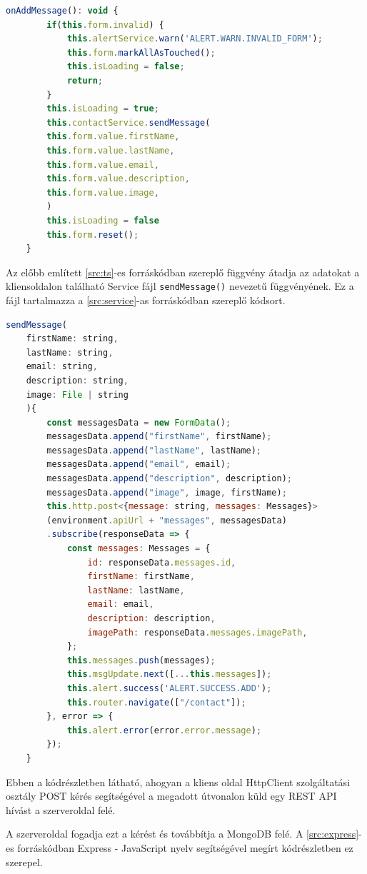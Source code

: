\begin{lstlisting}[language=JavaScript]
	onAddMessage(): void {
		if(this.form.invalid) {
			this.alertService.warn('ALERT.WARN.INVALID_FORM');
			this.form.markAllAsTouched();
			this.isLoading = false;
			return;
		}
		this.isLoading = true;
		this.contactService.sendMessage(
		this.form.value.firstName,
		this.form.value.lastName,
		this.form.value.email,
		this.form.value.description,
		this.form.value.image,
		)
		this.isLoading = false
		this.form.reset();
	}
\end{lstlisting}

Az előbb említett \ref{src:ts}-es forráskódban szereplő függvény átadja az adatokat a kliensoldalon található Service fájl \verb|sendMessage()| nevezetű függvényének. Ez a fájl tartalmazza a \ref{src:service}-as forráskódban szereplő kódsort.

\begin{lstlisting}[language=JavaScript]
	sendMessage(
	firstName: string, 
	lastName: string, 
	email: string, 
	description: string, 
	image: File | string
	){
		const messagesData = new FormData();
		messagesData.append("firstName", firstName);
		messagesData.append("lastName", lastName);
		messagesData.append("email", email);
		messagesData.append("description", description);
		messagesData.append("image", image, firstName);
		this.http.post<{message: string, messages: Messages}>
		(environment.apiUrl + "messages", messagesData)
		.subscribe(responseData => {
			const messages: Messages = {
				id: responseData.messages.id,
				firstName: firstName,
				lastName: lastName,
				email: email,
				description: description,
				imagePath: responseData.messages.imagePath,
			};
			this.messages.push(messages);
			this.msgUpdate.next([...this.messages]);
			this.alert.success('ALERT.SUCCESS.ADD');
			this.router.navigate(["/contact"]);
		}, error => {
			this.alert.error(error.error.message);
		});
	}
\end{lstlisting}

Ebben a kódrészletben látható, ahogyan a kliens oldal HttpClient szolgáltatási osztály POST kérés segítségével a megadott útvonalon küld egy REST API hívást a szerveroldal felé.

\bigskip
A szerveroldal fogadja ezt a kérést és továbbítja a MongoDB felé. A \ref{src:express}-es forráskódban Express - JavaScript nyelv segítségével megírt kódrészletben ez szerepel.

